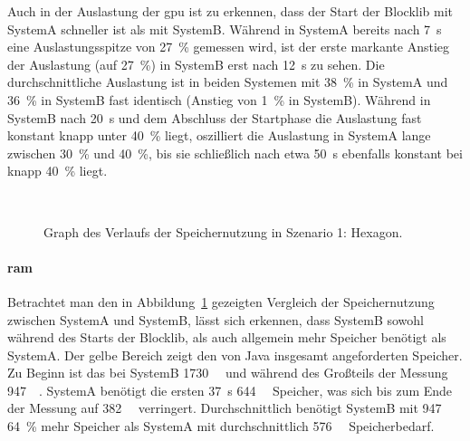 Auch in der Auslastung der \ac{gpu} ist zu erkennen, dass der Start der Blocklib mit SystemA schneller ist als mit SystemB. Während in SystemA bereits nach \SI{7}{\second} eine Auslastungsspitze von \SI{27}{\percent} gemessen wird, ist der erste markante Anstieg der Auslastung (auf \SI{27}{\percent}) in SystemB  erst nach \SI{12}{\second} zu sehen. Die durchschnittliche Auslastung ist in beiden Systemen mit \SI{38}{\percent} in SystemA und \SI{36}{\percent} in SystemB fast identisch (Anstieg von \SI{1}{\percent} in SystemB). Während in SystemB nach \SI{20}{\second} und dem Abschluss der Startphase die Auslastung fast konstant knapp unter \SI{40}{\percent} liegt, oszilliert die Auslastung in SystemA lange zwischen \SI{30}{\percent} und \SI{40}{\percent}, bis sie schließlich nach etwa \SI{50}{\second} ebenfalls konstant bei knapp \SI{40}{\percent} liegt.

\begin{figure}[!htbp]
	\\
	\caption{Graph des Verlaufs der Speichernutzung in Szenario 1: Hexagon.}\label{fig:seed-0-hexagon-mem}
\end{figure} 
\paragraph{\ac{ram}} Betrachtet man den in Abbildung~\ref{fig:seed-0-hexagon-mem} gezeigten Vergleich der Speichernutzung zwischen SystemA und SystemB, lässt sich erkennen, dass SystemB sowohl während des Starts der Blocklib, als auch allgemein mehr Speicher benötigt als SystemA. Der gelbe Bereich zeigt den von Java insgesamt angeforderten Speicher. Zu Beginn ist das bei SystemB \SI{1730}{\mega\byte} und während des Großteils der Messung \SI{947}{\mega\byte}. SystemA benötigt die ersten \SI{37}{\second} \SI{644}{\mega\byte} Speicher, was sich bis zum Ende der Messung auf \SI{382}{\mega\byte} verringert. Durchschnittlich benötigt SystemB mit \SI{947}{\mega\byte} \SI{64}{\percent} mehr Speicher als SystemA mit durchschnittlich \SI{576}{\mega\byte} Speicherbedarf.

